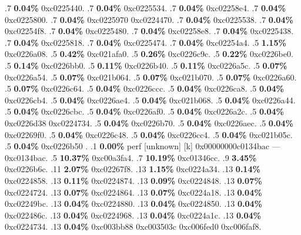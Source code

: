\begin{profile}
{.7 \textbf{0.04\%} 0xc0225440. 
.7 \textbf{0.04\%} 0xc0225534. 
.7 \textbf{0.04\%} 0xc02258e4. 
.7 \textbf{0.04\%} 0xc0225800. 
.7 \textbf{0.04\%} 0xc0225970\newline {} 0xc0224470. 
.7 \textbf{0.04\%} 0xc0225538. 
.7 \textbf{0.04\%} 0xc02254f8. 
.7 \textbf{0.04\%} 0xc0225480. 
.7 \textbf{0.04\%} 0xc02258e8. 
.7 \textbf{0.04\%} 0xc0225438. 
.7 \textbf{0.04\%} 0xc0225818. 
.7 \textbf{0.04\%} 0xc0225474. 
.7 \textbf{0.04\%} 0xc02254a4. 
.5 \textbf{1.15\%} 0xc0226a08. 
.5 \textbf{0.42\%} 0xc021afa0. 
.5 \textbf{0.26\%} 0xc0226c9c. 
.5 \textbf{0.22\%} 0xc0226be0. 
.5 \textbf{0.14\%} 0xc0226bb0. 
.5 \textbf{0.11\%} 0xc0226b40. 
.5 \textbf{0.11\%} 0xc0226a5c. 
.5 \textbf{0.07\%} 0xc0226a54. 
.5 \textbf{0.07\%} 0xc021b064. 
.5 \textbf{0.07\%} 0xc021b070. 
.5 \textbf{0.07\%} 0xc0226a60. 
.5 \textbf{0.07\%} 0xc0226c64. 
.5 \textbf{0.04\%} 0xc0226ccc. 
.5 \textbf{0.04\%} 0xc0226ca8. 
.5 \textbf{0.04\%} 0xc0226cb4. 
.5 \textbf{0.04\%} 0xc0226ae4. 
.5 \textbf{0.04\%} 0xc021b068. 
.5 \textbf{0.04\%} 0xc0226a44. 
.5 \textbf{0.04\%} 0xc0226cbc. 
.5 \textbf{0.04\%} 0xc0226af0. 
.5 \textbf{0.04\%} 0xc0226a2c. 
.5 \textbf{0.04\%} 0xc0226d38\newline {} 0xc0224734. 
.5 \textbf{0.04\%} 0xc0226b70. 
.5 \textbf{0.04\%} 0xc0226aec. 
.5 \textbf{0.04\%} 0xc02269f0. 
.5 \textbf{0.04\%} 0xc0226c48. 
.5 \textbf{0.04\%} 0xc0226cc4. 
.5 \textbf{0.04\%} 0xc021b05c. 
.5 \textbf{0.04\%} 0xc0226b50\newline {} . 
.1 \textbf{ 0.00\%} perf             [unknown]              [k] 0x00000000c0134bac\newline {} ---0xc0134bac. 
.5 \textbf{10.37\%} 0xc00a3fa4. 
.7 \textbf{10.19\%} 0xc01346cc. 
.9 \textbf{3.45\%} 0xc0226b6c. 
.11 \textbf{2.07\%} 0xc02267f8. 
.13 \textbf{1.15\%} 0xc0224a34. 
.13 \textbf{0.14\%} 0xc0224858. 
.13 \textbf{0.11\%} 0xc0224874. 
.13 \textbf{0.09\%} 0xc0224848. 
.13 \textbf{0.07\%} 0xc0224724. 
.13 \textbf{0.07\%} 0xc0224864. 
.13 \textbf{0.07\%} 0xc0224a18. 
.13 \textbf{0.04\%} 0xc02249bc. 
.13 \textbf{0.04\%} 0xc0224880. 
.13 \textbf{0.04\%} 0xc0224850. 
.13 \textbf{0.04\%} 0xc022486c. 
.13 \textbf{0.04\%} 0xc0224968. 
.13 \textbf{0.04\%} 0xc0224a1c. 
.13 \textbf{0.04\%} 0xc0224734. 
.13 \textbf{0.04\%} 0xc003bb88\newline {} 0xc003503c\newline {} 0xc006fed0\newline {} 0xc006faf8. 
}
\end{profile}
